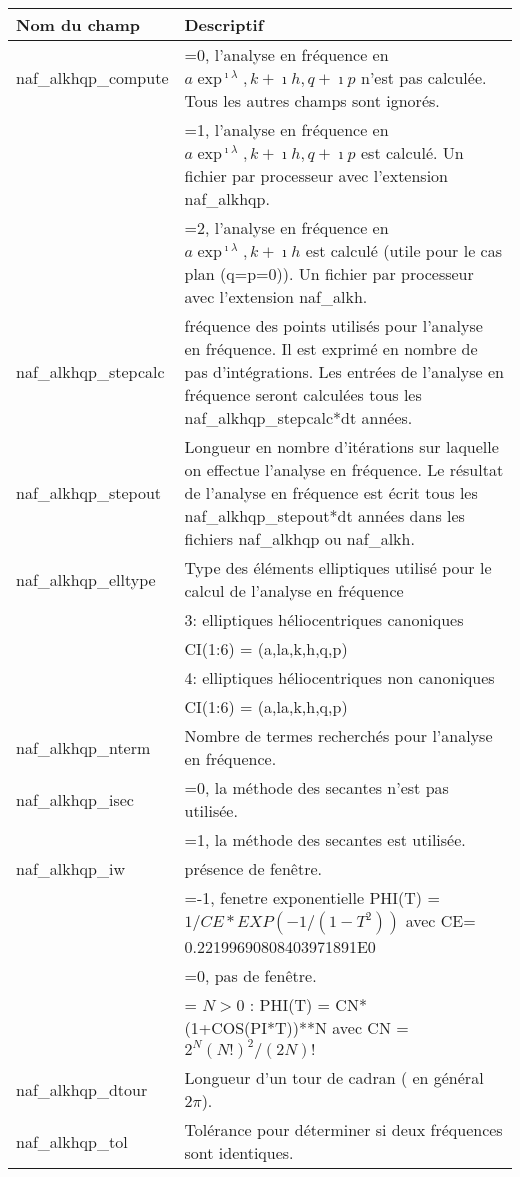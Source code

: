 \documentclass[11pt]{article}
\begin{document}
\begin{tabularx}{\textwidth}{|l|X|}
\hline
Nom du champ& Descriptif \\ \hline \hline
naf\_alkhqp\_compute &  =0, l'analyse en fr\'equence en $a\exp^{\imath\lambda}, k+\imath h, q+\imath p$ n'est pas calcul\'ee. Tous les autres champs sont ignor\'es.\\
&=1, l'analyse en fr\'equence en $a\exp^{\imath\lambda}, k+\imath h, q+\imath p$ est calcul\'e. Un fichier par processeur avec l'extension naf\_alkhqp.\\ 
&=2, l'analyse en fr\'equence en $a\exp^{\imath\lambda}, k+\imath h$ est calcul\'e (utile pour le cas  plan (q=p=0)). Un fichier par processeur avec l'extension naf\_alkh.\\ \hline

naf\_alkhqp\_stepcalc  & fr\'equence des points utilis\'es pour l'analyse en fr\'equence. Il est exprim\'e en nombre de pas d'int\'egrations. Les entr\'ees de l'analyse en fr\'equence seront calcul\'ees tous les naf\_alkhqp\_stepcalc*dt ann\'ees. \\ \hline

naf\_alkhqp\_stepout  & Longueur en nombre d'it\'erations sur laquelle on effectue l'analyse en fr\'equence. Le r\'esultat de l'analyse en fr\'equence est \'ecrit tous les naf\_alkhqp\_stepout*dt ann\'ees dans les fichiers naf\_alkhqp ou naf\_alkh.\\ \hline

naf\_alkhqp\_elltype  & Type des \'el\'ements elliptiques utilis\'e pour le calcul de l'analyse en fr\'equence\\ 
&3:  elliptiques h\'eliocentriques canoniques\\
&	     CI(1:6) = (a,la,k,h,q,p)\\
&4:  elliptiques h\'eliocentriques non canoniques\\
&	     CI(1:6) = (a,la,k,h,q,p)\\ \hline
naf\_alkhqp\_nterm  & Nombre de termes recherch\'es pour l'analyse en fr\'equence.\\ \hline
naf\_alkhqp\_isec  & =0, la m\'ethode des secantes n'est pas utilis\'ee.\\
&=1, la m\'ethode des secantes est utilis\'ee.\\ \hline
naf\_alkhqp\_iw  & pr\'esence de fen\^etre.\\
&=-1, fenetre exponentielle PHI(T) = $1/CE*EXP(-1/(1-T^2))$ avec CE= 0.22199690808403971891E0\\
&=0, pas de fen\^etre.\\
&= $N>0$ : PHI(T) = CN*(1+COS(PI*T))**N avec CN = $2^N(N!)^2/(2N)!$\\ \hline
naf\_alkhqp\_dtour  & Longueur d'un tour de cadran ( en g\'en\'eral $2\pi$).\\ \hline
naf\_alkhqp\_tol  &  Tol\'erance pour d\'eterminer si deux fr\'equences sont identiques.\\ \hline

 \end{tabularx}
\end{document}
